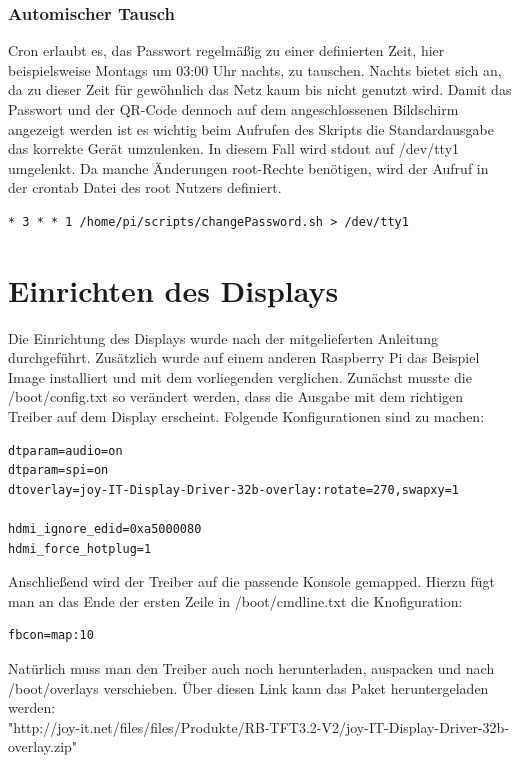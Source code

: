 \documentclass[a4paper,11pt,singlespacing]{article}
\begin{document}
    		\subsubsection{Automischer Tausch}
    			Cron erlaubt es, das Passwort regelmäßig zu einer definierten Zeit, hier beispielsweise Montags um 03:00 Uhr nachts, zu tauschen. Nachts bietet sich an, da zu dieser Zeit für gewöhnlich das Netz kaum bis nicht genutzt wird. Damit das Passwort und der QR-Code dennoch auf dem angeschlossenen Bildschirm angezeigt werden ist es wichtig beim Aufrufen des Skripts die Standardausgabe das korrekte Gerät umzulenken. In diesem Fall wird stdout auf /dev/tty1 umgelenkt. Da manche Änderungen root-Rechte benötigen, wird der Aufruf in der crontab Datei des root Nutzers definiert.
    			\begin{lstlisting}
* 3 * * 1 /home/pi/scripts/changePassword.sh > /dev/tty1
    			\end{lstlisting}
    		
    \section{Einrichten des Displays}
    		Die Einrichtung des Displays wurde nach der mitgelieferten Anleitung durchgeführt. \cite{Quote_display_manual} Zusätzlich wurde auf einem anderen Raspberry Pi das Beispiel Image installiert und mit dem vorliegenden verglichen. Zunächst musste die /boot/config.txt so verändert werden, dass die Ausgabe mit dem richtigen Treiber auf dem Display erscheint. Folgende Konfigurationen sind zu machen:
    		\begin{lstlisting}
dtparam=audio=on
dtparam=spi=on
dtoverlay=joy-IT-Display-Driver-32b-overlay:rotate=270,swapxy=1

hdmi_ignore_edid=0xa5000080
hdmi_force_hotplug=1
    		\end{lstlisting}
    		
    		Anschließend wird der Treiber auf die passende Konsole gemapped. Hierzu fügt man an das Ende der ersten Zeile in /boot/cmdline.txt die Knofiguration:
    		\begin{lstlisting}
fbcon=map:10
    		\end{lstlisting}

			Natürlich muss man den Treiber auch noch herunterladen, auspacken und nach /boot/overlays verschieben. Über diesen Link kann das Paket heruntergeladen werden:\\
			
			"http://joy-it.net/files/files/Produkte/RB-TFT3.2-V2/joy-IT-Display-Driver-32b-overlay.zip" \\
\end{document}
